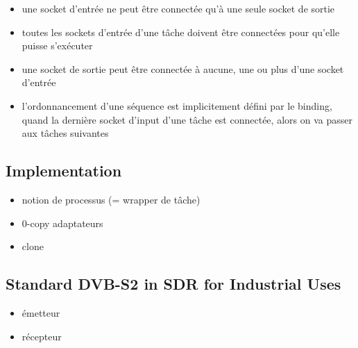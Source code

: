 \begin{itemize}
  \item une socket d'entrée ne peut être connectée qu'à une seule socket de
        sortie
  \item toutes les sockets d'entrée d'une tâche doivent être connectées pour
        qu'elle puisse s'exécuter
  \item une socket de sortie peut être connectée à aucune, une ou plus d'une
        socket d'entrée
  \item l'ordonnancement d'une séquence est implicitement défini par le binding,
        quand la dernière socket d'input d'une tâche est connectée, alors on va
        passer aux tâches suivantes
\end{itemize}

\subsection{Implementation}

\begin{itemize}
  \item notion de processus (= wrapper de tâche)
  \item 0-copy adaptateurs
  \item clone
\end{itemize}

\subsection{Standard DVB-S2 in SDR for Industrial Uses}

\begin{itemize}
  \item émetteur
  \item récepteur
\end{itemize}
